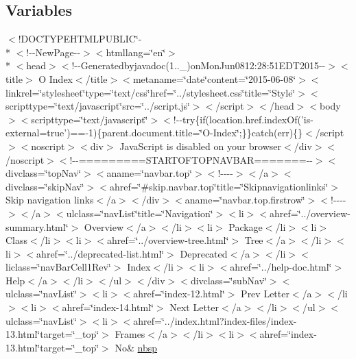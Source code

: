 \subsection*{Variables}
\begin{DoxyCompactItemize}
\item 
$<$!D\-O\-C\-T\-Y\-P\-E\-H\-T\-M\-L\-P\-U\-B\-L\-I\-C\char`\"{}-\/\\*
$<$!-\/-\/New\-Page-\/-\/$>$$<$htmllang=\char`\"{}en\char`\"{}$>$\\*
$<$head$>$$<$!-\/-\/Generatedbyjavadoc(1..\-\_)on\-Mon\-Jun0812\-:28\-:51\-E\-D\-T2015-\/-\/$>$$<$title$>$ O Index$<$/title$>$$<$metaname=\char`\"{}date\char`\"{}content=\char`\"{}2015-\/06-\/08\char`\"{}$>$$<$linkrel=\char`\"{}stylesheet\char`\"{}type=\char`\"{}text/css\char`\"{}href=\char`\"{}../stylesheet.\-css\char`\"{}title=\char`\"{}\-Style\char`\"{}$>$$<$scripttype=\char`\"{}text/javascript\char`\"{}src=\char`\"{}../script.\-js\char`\"{}$>$$<$/script$>$$<$/head$>$$<$body$>$$<$scripttype=\char`\"{}text/javascript\char`\"{}$>$$<$!-\/-\/try\{if(location.\-href.\-index\-Of('is-\/external=true')==-\/1)\{parent.\-document.\-title=\char`\"{}\-O-\/\-Index\char`\"{};\}\}catch(err)\{\}$<$/script$>$$<$noscript$>$$<$div$>$ Java\-Script is disabled on your browser$<$/div$>$$<$/noscript$>$$<$!-\/-\/=========\-S\-T\-A\-R\-T\-O\-F\-T\-O\-P\-N\-A\-V\-B\-A\-R=======-\/-\/$>$$<$divclass=\char`\"{}top\-Nav\char`\"{}$>$$<$aname=\char`\"{}navbar.\-top\char`\"{}$>$$<$!-\/-\/-\/-\/$>$$<$/a$>$$<$divclass=\char`\"{}skip\-Nav\char`\"{}$>$$<$ahref=\char`\"{}\#skip.\-navbar.\-top\char`\"{}title=\char`\"{}\-Skipnavigationlinks\char`\"{}$>$ Skip navigation links$<$/a$>$$<$/div$>$$<$aname=\char`\"{}navbar.\-top.\-firstrow\char`\"{}$>$$<$!-\/-\/-\/-\/$>$$<$/a$>$$<$ulclass=\char`\"{}nav\-List\char`\"{}title=\char`\"{}\-Navigation\char`\"{}$>$$<$li$>$$<$ahref=\char`\"{}../overview-\/summary.\-html\char`\"{}$>$ Overview$<$/a$>$$<$/li$>$$<$li$>$ Package$<$/li$>$$<$li$>$ Class$<$/li$>$$<$li$>$$<$ahref=\char`\"{}../overview-\/tree.\-html\char`\"{}$>$ Tree$<$/a$>$$<$/li$>$$<$li$>$$<$ahref=\char`\"{}../deprecated-\/list.\-html\char`\"{}$>$ Deprecated$<$/a$>$$<$/li$>$$<$liclass=\char`\"{}nav\-Bar\-Cell1\-Rev\char`\"{}$>$ Index$<$/li$>$$<$li$>$$<$ahref=\char`\"{}../help-\/doc.\-html\char`\"{}$>$ Help$<$/a$>$$<$/li$>$$<$/ul$>$$<$/div$>$$<$divclass=\char`\"{}sub\-Nav\char`\"{}$>$$<$ulclass=\char`\"{}nav\-List\char`\"{}$>$$<$li$>$$<$ahref=\char`\"{}index-\/12.\-html\char`\"{}$>$ Prev Letter$<$/a$>$$<$/li$>$$<$li$>$$<$ahref=\char`\"{}index-\/14.\-html\char`\"{}$>$ Next Letter$<$/a$>$$<$/li$>$$<$/ul$>$$<$ulclass=\char`\"{}nav\-List\char`\"{}$>$$<$li$>$$<$ahref=\char`\"{}../index.\-html?index-\/files/index-\/13.\-html\char`\"{}target=\char`\"{}\-\_\-top\char`\"{}$>$ Frames$<$/a$>$$<$/li$>$$<$li$>$$<$ahref=\char`\"{}index-\/13.\-html\char`\"{}target=\char`\"{}\-\_\-top\char`\"{}$>$ No\& \hyperlink{index-13_8html_a479d00f21dbca369efe3be97f1ef785a}{nbsp}
\end{DoxyCompactItemize}


